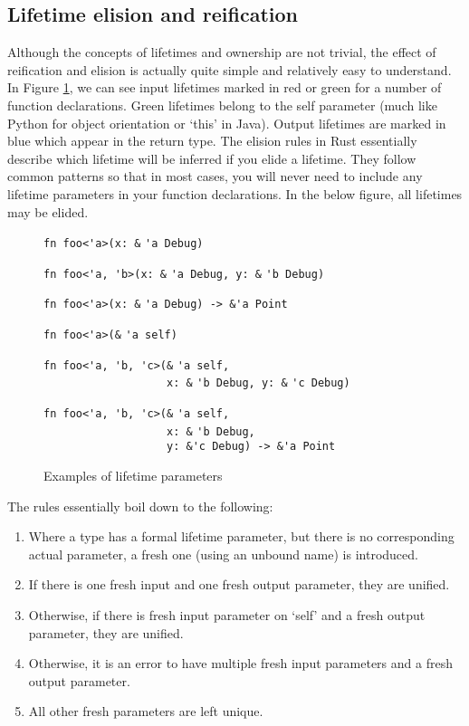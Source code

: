 \subsection{Lifetime elision and reification}

Although the concepts of lifetimes and ownership are not trivial, the effect of reification and elision is actually quite simple and relatively easy to understand. In Figure \ref{Fig:lifetimes}, we can see input lifetimes marked in red or green for a number of function declarations. Green lifetimes belong to the self parameter (much like Python for object orientation or `this' in Java). Output lifetimes are marked in blue which appear in the return type. The elision rules in Rust essentially describe which lifetime will be inferred if you elide a lifetime. They follow common patterns so that in most cases, you will never need to include any lifetime parameters in your function declarations. In the below figure, all lifetimes may be elided.

\begin{figure}
{\verb|fn foo<'a>(x: &|}
{\color{red} \verb|'a|}{\verb| Debug)|}

{\verb|fn foo<'a, 'b>(x: &|}
{\color{red} \verb|'a|}{\verb| Debug, y: &|}{\color{red} \verb|'b|}{\verb| Debug)|}

{\verb|fn foo<'a>(x: &|}
{\color{red} \verb|'a|}{\verb| Debug) -> &|}{\color{blue}\verb|'a|}{\verb| Point|}

{\verb|fn foo<'a>(&|}
{\color{green} \verb|'a|}{\verb| self)|}

{\verb|fn foo<'a, 'b, 'c>(&|}{\color{green} \verb|'a|}{\verb| self,|}\\
{\verb|                   x: &|}{\color{red} \verb|'b|}{\verb| Debug, y: &|}{\color{red} \verb|'c|}{\verb| Debug)|}

{\verb|fn foo<'a, 'b, 'c>(&|}{\color{green} \verb|'a|}{\verb| self,|}\\
{\verb|                   x: &|}{\color{red} \verb|'b|}{\verb| Debug,|}\\
{\verb|                   y: &|}{\color{red}\verb|'c|}{\verb| Debug) -> &|}{\color{blue}\verb|'a|}{\verb| Point|}

\caption{Examples of lifetime parameters}
\label{Fig:lifetimes}
\end{figure}

The rules essentially boil down to the following:
\begin{enumerate}
\item Where a type has a formal lifetime parameter, but there is no corresponding actual parameter, a fresh one (using an unbound name) is introduced.
\item If there is one fresh input and one fresh output parameter, they are unified.
\item Otherwise, if there is fresh input parameter on `self' and a fresh output parameter, they are unified.
\item Otherwise, it is an error to have multiple fresh input parameters and a fresh output parameter.
\item All other fresh parameters are left unique.
\end{enumerate}

